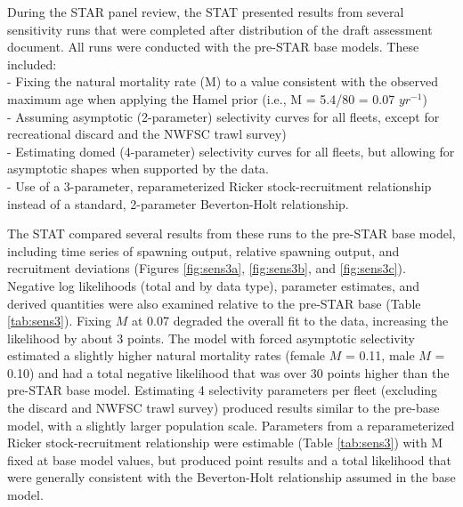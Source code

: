 \documentclass[11pt,
  english,
]{article}
\begin{document}
During the STAR panel review, the STAT presented results from several sensitivity runs that were completed after distribution of the draft assessment document. All runs were conducted with the pre-STAR base models. These included:\\
- Fixing the natural mortality rate (M) to a value consistent with the observed maximum age when applying the Hamel prior (i.e., M = 5.4/80 = 0.07 {\(yr^{-1}\)\leavevmode\tagmcend\tagstructend})\\
- Assuming asymptotic (2-parameter) selectivity curves for all fleets, except for recreational discard and the NWFSC trawl survey)\\
- Estimating domed (4-parameter) selectivity curves for all fleets, but allowing for asymptotic shapes when supported by the data.\\
- Use of a 3-parameter, reparameterized Ricker stock-recruitment relationship instead of a standard, 2-parameter Beverton-Holt relationship.

The STAT compared several results from these runs to the pre-STAR base model, including time series of spawning output, relative spawning output, and recruitment deviations (Figures \ref{fig:sens3a}, \ref{fig:sens3b}, and \ref{fig:sens3c}). Negative log likelihoods (total and by data type), parameter estimates, and derived quantities were also examined relative to the pre-STAR base (Table \ref{tab:sens3}). Fixing {\(M\)\leavevmode\tagmcend\tagstructend} at 0.07 degraded the overall fit to the data, increasing the likelihood by about 3 points. The model with forced asymptotic selectivity estimated a slightly higher natural mortality rates (female {\(M\)\leavevmode\tagmcend\tagstructend} = 0.11, male {\(M\)\leavevmode\tagmcend\tagstructend} = 0.10) and had a total negative likelihood that was over 30 points higher than the pre-STAR base model. Estimating 4 selectivity parameters per fleet (excluding the discard and NWFSC trawl survey) produced results similar to the pre-base model, with a slightly larger population scale. Parameters from a reparameterized Ricker stock-recruitment relationship were estimable (Table \ref{tab:sens3}) with M fixed at base model values, but produced point results and a total likelihood that were generally consistent with the Beverton-Holt relationship assumed in the base model.
\end{document}
